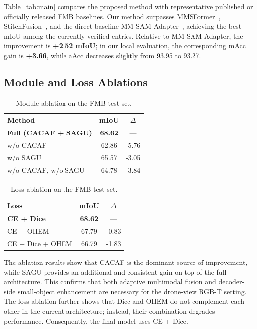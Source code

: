 Table~\ref{tab:main} compares the proposed method with representative published or officially released FMB baselines. Our method surpasses MMSFormer~\cite{reza2024mmsformer}, StitchFusion~\cite{li2024stitchfusion}, and the direct baseline MM SAM-Adapter~\cite{curti2025mmsamadapter}, achieving the best mIoU among the currently verified entries. Relative to MM SAM-Adapter, the improvement is \textbf{+2.52 mIoU}; in our local evaluation, the corresponding mAcc gain is \textbf{+3.66}, while aAcc decreases slightly from 93.95 to 93.27.

\subsection{Module and Loss Ablations}

\begin{table}[t]
    \centering
    \caption{Module ablation on the FMB test set.}
    \label{tab:ablation}
    \begin{tabular}{lcc}
        \toprule
        Method & mIoU & $\Delta$ \\
        \midrule
        \textbf{Full (CACAF + SAGU)} & \textbf{68.62} & --- \\
        w/o CACAF & 62.86 & -5.76 \\
        w/o SAGU & 65.57 & -3.05 \\
        w/o CACAF, w/o SAGU & 64.78 & -3.84 \\
        \bottomrule
    \end{tabular}
\end{table}

\begin{table}[t]
    \centering
    \caption{Loss ablation on the FMB test set.}
    \label{tab:loss}
    \begin{tabular}{lcc}
        \toprule
        Loss & mIoU & $\Delta$ \\
        \midrule
        \textbf{CE + Dice} & \textbf{68.62} & --- \\
        CE + OHEM & 67.79 & -0.83 \\
        CE + Dice + OHEM & 66.79 & -1.83 \\
        \bottomrule
    \end{tabular}
\end{table}

The ablation results show that CACAF is the dominant source of improvement, while SAGU provides an additional and consistent gain on top of the full architecture. This confirms that both adaptive multimodal fusion and decoder-side small-object enhancement are necessary for the drone-view RGB-T setting. The loss ablation further shows that Dice and OHEM do not complement each other in the current architecture; instead, their combination degrades performance. Consequently, the final model uses CE + Dice.

